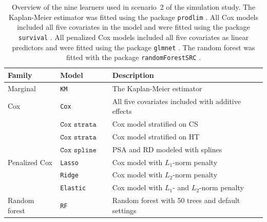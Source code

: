 \documentclass[a4,danish]{article}
\begin{document}
\begin{table}[h]
  \centering
  \begin{tabular}{ lll }
    \toprule
    Family & Model & Description \\
    \midrule
    Marginal & \texttt{KM} & The Kaplan-Meier estimator \\ 
    Cox & \texttt{Cox} & All five covariates included with additive effects \\
           & \( \texttt{Cox strata CS} \)  & Cox model stratified on CS  \\
           & \( \texttt{Cox strata HT} \)  & Cox model stratified on HT \\
           & \( \texttt{Cox spline} \)  & PSA and RD modeled with splines \\ 
    Penalized Cox & \texttt{Lasso} & Cox model with \( L_1 \)-norm penalty   \\
           & \texttt{Ridge} & Cox model with \( L_2 \)-norm penalty \\
           & \texttt{Elastic} & Cox model with \( L_1 \)- and \( L_2 \)-norm penalty \\
    Random forest & \texttt{RF} & Random forest with 50 trees and default settings \\
    \bottomrule 
  \end{tabular}
  \caption[]{Overview of the nine learners used in scenario~2 of the simulation
    study. The Kaplan-Meier estimator was fitted using the package
    \texttt{prodlim} \citep{Gerds_2019prodlim}. All Cox models included all five
    covariates in the model and were fitted using the package \texttt{survival}
    \citep{survival-package}. All penalized Cox models included all five
    covariates as linear predictors and were fitted using the package
    \texttt{glmnet} \citep{glmnet-cox,glmnet-glm}. The random forest was fitted
    with the package \texttt{randomForestSRC} \citep{rfsrc-paclage}.}
  \label{tab:zel-library}
\end{table}
\end{document}
